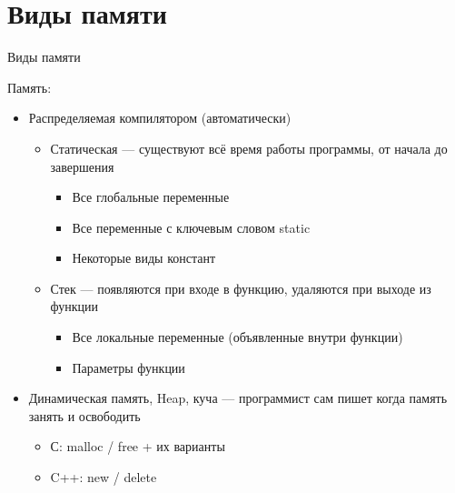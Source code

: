 \section{Виды памяти}
\begin{frame}[t,fragile]{Виды памяти}

Память:   
\begin{itemize}
  \item Распределяемая компилятором (автоматически)
  \begin{itemize}
     \item Статическая --- существуют всё время работы программы, от начала до завершения
     \begin{itemize}
        \item Все глобальные переменные
        \item Все переменные с ключевым словом static
        \item Некоторые виды констант
     \end{itemize}
     \item Стек --- появляются при входе в функцию, удаляются при выходе из функции 
     \begin{itemize}
        \item Все локальные переменные (объявленные внутри функции)
        \item Параметры функции 
     \end{itemize}
  \end{itemize}
  \item Динамическая память, Heap, куча --- программист сам пишет когда память занять и освободить
     \begin{itemize}
        \item С: malloc / free + их варианты
        \item C++: new / delete
     \end{itemize}
  \end{itemize}
\end{frame}

